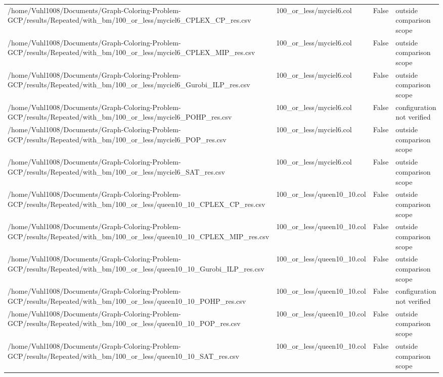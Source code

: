 \begin{table}[htbp]
\begin{tabular}{llll}
/home/Vuhl1008/Documents/Graph-Coloring-Problem-GCP/results/Repeated/with\_bm/100\_or\_less/myciel6\_CPLEX\_CP\_res.csv & 100\_or\_less/myciel6.col & False & outside comparison scope \\
/home/Vuhl1008/Documents/Graph-Coloring-Problem-GCP/results/Repeated/with\_bm/100\_or\_less/myciel6\_CPLEX\_MIP\_res.csv & 100\_or\_less/myciel6.col & False & outside comparison scope \\
/home/Vuhl1008/Documents/Graph-Coloring-Problem-GCP/results/Repeated/with\_bm/100\_or\_less/myciel6\_Gurobi\_ILP\_res.csv & 100\_or\_less/myciel6.col & False & outside comparison scope \\
/home/Vuhl1008/Documents/Graph-Coloring-Problem-GCP/results/Repeated/with\_bm/100\_or\_less/myciel6\_POHP\_res.csv & 100\_or\_less/myciel6.col & False & configuration not verified \\
/home/Vuhl1008/Documents/Graph-Coloring-Problem-GCP/results/Repeated/with\_bm/100\_or\_less/myciel6\_POP\_res.csv & 100\_or\_less/myciel6.col & False & outside comparison scope \\
/home/Vuhl1008/Documents/Graph-Coloring-Problem-GCP/results/Repeated/with\_bm/100\_or\_less/myciel6\_SAT\_res.csv & 100\_or\_less/myciel6.col & False & outside comparison scope \\
/home/Vuhl1008/Documents/Graph-Coloring-Problem-GCP/results/Repeated/with\_bm/100\_or\_less/queen10\_10\_CPLEX\_CP\_res.csv & 100\_or\_less/queen10\_10.col & False & outside comparison scope \\
/home/Vuhl1008/Documents/Graph-Coloring-Problem-GCP/results/Repeated/with\_bm/100\_or\_less/queen10\_10\_CPLEX\_MIP\_res.csv & 100\_or\_less/queen10\_10.col & False & outside comparison scope \\
/home/Vuhl1008/Documents/Graph-Coloring-Problem-GCP/results/Repeated/with\_bm/100\_or\_less/queen10\_10\_Gurobi\_ILP\_res.csv & 100\_or\_less/queen10\_10.col & False & outside comparison scope \\
/home/Vuhl1008/Documents/Graph-Coloring-Problem-GCP/results/Repeated/with\_bm/100\_or\_less/queen10\_10\_POHP\_res.csv & 100\_or\_less/queen10\_10.col & False & configuration not verified \\
/home/Vuhl1008/Documents/Graph-Coloring-Problem-GCP/results/Repeated/with\_bm/100\_or\_less/queen10\_10\_POP\_res.csv & 100\_or\_less/queen10\_10.col & False & outside comparison scope \\
/home/Vuhl1008/Documents/Graph-Coloring-Problem-GCP/results/Repeated/with\_bm/100\_or\_less/queen10\_10\_SAT\_res.csv & 100\_or\_less/queen10\_10.col & False & outside comparison scope \\

\end{tabular}
\end{table}
